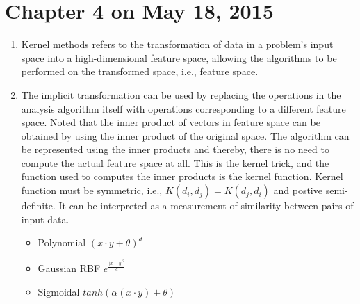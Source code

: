\documentclass[14pt]{article}
\begin{document}
\section{Chapter 4 on May 18, 2015}
\begin{enumerate}
 \item Kernel methods refers to the transformation of data in a problem's input space into a high-dimensional feature space, allowing the algorithms to be performed on the transformed space, i.e., feature space.
 
 \item The implicit transformation can be used by replacing the operations in the analysis algorithm itself with operations corresponding to a different feature space. Noted that the inner product of vectors in feature space can be obtained by using the inner product of the original space. The algorithm can be represented using the inner products and thereby, there is no need to compute the actual feature space at all. This is the kernel trick, and the function used to computes the inner products is the kernel function. Kernel function must be symmetric, i.e., $K(d_i, d_j) = K(d_j, d_i)$ and postive semi-definite. It can be interpreted as a measurement of similarity between pairs of input data. 
  \begin{itemize}
   \item Polynomial $(x \cdot y + \theta)^d$
   \item Gaussian RBF $e^{\frac{|x-y|^2}{c}}$
   \item Sigmoidal $tanh (\alpha(x \cdot y) + \theta)$
  \end{itemize}
\end{enumerate}
 
\end{document}
